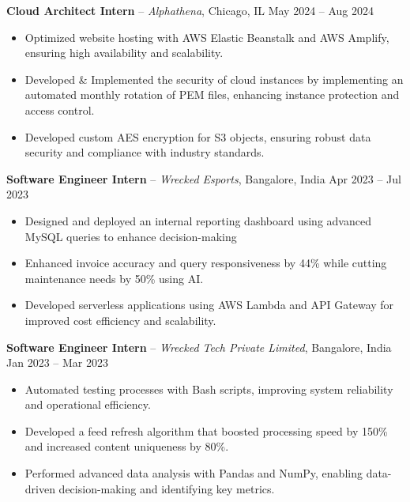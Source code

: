 \documentclass[10pt, letterpaper]{article}
\begin{document}
\textbf{\textcolor{myNavy}{Cloud Architect Intern}} -- \textit{Alphathena}, Chicago, IL \hfill \textcolor{myDarkGray}{May 2024 -- Aug 2024}
\begin{itemize}[leftmargin=*, itemsep=0pt, parsep=0pt]
    \item Optimized website hosting with AWS Elastic Beanstalk and AWS Amplify, ensuring high availability and scalability.
    \item Developed \& Implemented the security of cloud instances by implementing an automated monthly rotation of PEM files, enhancing instance protection and access control.
    \item Developed custom AES encryption for S3 objects, ensuring robust data security and compliance with industry standards.
\end{itemize}

\textbf{\textcolor{myNavy}{Software Engineer Intern}} -- \textit{Wrecked Esports}, Bangalore, India \hfill \textcolor{myDarkGray}{Apr 2023 -- Jul 2023}
\begin{itemize}[leftmargin=*, itemsep=0pt, parsep=0pt]
    \item Designed and deployed an internal reporting dashboard using advanced MySQL queries to enhance decision-making
    \item Enhanced invoice accuracy and query responsiveness by 44\% while cutting maintenance needs by 50\% using AI.
    \item Developed serverless applications using AWS Lambda and API Gateway for improved cost efficiency and scalability.
\end{itemize}

\textbf{\textcolor{myNavy}{Software Engineer Intern}} -- \textit{Wrecked Tech Private Limited}, Bangalore, India \hfill \textcolor{myDarkGray}{Jan 2023 -- Mar 2023}
\begin{itemize}[leftmargin=*, itemsep=0pt, parsep=0pt]
    \item Automated testing processes with Bash scripts, improving system reliability and operational efficiency.
    \item Developed a feed refresh algorithm that boosted processing speed by 150\% and increased content uniqueness by 80\%.
    \item Performed advanced data analysis with Pandas and NumPy, enabling data-driven decision-making and identifying key metrics.
\end{itemize}

\vspace{0.08cm}
\end{document}
